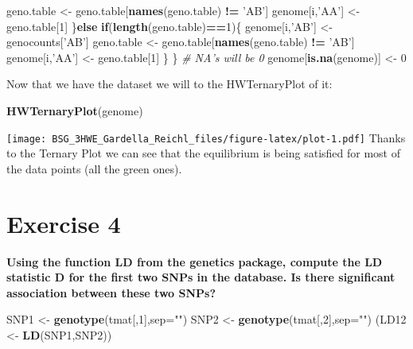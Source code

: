 \documentclass[]{article}
\newenvironment{Shaded}{\begin{snugshade}}{\end{snugshade}}
\newcommand{\KeywordTok}[1]{\textcolor[rgb]{0.13,0.29,0.53}{\textbf{#1}}}
\newcommand{\DataTypeTok}[1]{\textcolor[rgb]{0.13,0.29,0.53}{#1}}
\newcommand{\DecValTok}[1]{\textcolor[rgb]{0.00,0.00,0.81}{#1}}
\newcommand{\StringTok}[1]{\textcolor[rgb]{0.31,0.60,0.02}{#1}}
\newcommand{\CommentTok}[1]{\textcolor[rgb]{0.56,0.35,0.01}{\textit{#1}}}
\newcommand{\ControlFlowTok}[1]{\textcolor[rgb]{0.13,0.29,0.53}{\textbf{#1}}}
\newcommand{\OperatorTok}[1]{\textcolor[rgb]{0.81,0.36,0.00}{\textbf{#1}}}
\newcommand{\NormalTok}[1]{#1}
\begin{document}
\begin{Shaded}
\begin{Highlighting}[]
\NormalTok{    geno.table <-}\StringTok{ }\NormalTok{geno.table[}\KeywordTok{names}\NormalTok{(geno.table) }\OperatorTok{!=}\StringTok{ 'AB'}\NormalTok{]}
\NormalTok{    genome[i,}\StringTok{'AA'}\NormalTok{] <-}\StringTok{ }\NormalTok{geno.table[}\DecValTok{1}\NormalTok{]}
\NormalTok{  \}}\ControlFlowTok{else} \ControlFlowTok{if}\NormalTok{(}\KeywordTok{length}\NormalTok{(geno.table)}\OperatorTok{==}\DecValTok{1}\NormalTok{)\{}
\NormalTok{    genome[i,}\StringTok{'AB'}\NormalTok{] <-}\StringTok{ }\NormalTok{genocounts[}\StringTok{'AB'}\NormalTok{]  }
\NormalTok{    geno.table <-}\StringTok{ }\NormalTok{geno.table[}\KeywordTok{names}\NormalTok{(geno.table) }\OperatorTok{!=}\StringTok{ 'AB'}\NormalTok{]}
\NormalTok{    genome[i,}\StringTok{'AA'}\NormalTok{] <-}\StringTok{ }\NormalTok{geno.table[}\DecValTok{1}\NormalTok{]}
\NormalTok{  \}}
\NormalTok{\}}
\CommentTok{# NA's will be 0}
\NormalTok{genome[}\KeywordTok{is.na}\NormalTok{(genome)] <-}\StringTok{ }\DecValTok{0}
\end{Highlighting}
\end{Shaded}

Now that we have the dataset we will to the HWTernaryPlot of it:

\begin{Shaded}
\begin{Highlighting}[]
\KeywordTok{HWTernaryPlot}\NormalTok{(genome)}
\end{Highlighting}
\end{Shaded}

\texttt{[image: BSG\_3HWE\_Gardella\_Reichl\_files/figure-latex/plot-1.pdf]}
Thanks to the Ternary Plot we can see that the equilibrium is being
satisfied for most of the data points (all the green ones).

\section{Exercise 4}\label{exercise-4}

\textbf{Using the function LD from the genetics package, compute the LD
statistic D for the first two SNPs in the database. Is there significant
association between these two SNPs?}

\begin{Shaded}
\begin{Highlighting}[]
\NormalTok{SNP1 <-}\StringTok{ }\KeywordTok{genotype}\NormalTok{(tmat[,}\DecValTok{1}\NormalTok{],}\DataTypeTok{sep=}\StringTok{""}\NormalTok{)}
\NormalTok{SNP2 <-}\StringTok{ }\KeywordTok{genotype}\NormalTok{(tmat[,}\DecValTok{2}\NormalTok{],}\DataTypeTok{sep=}\StringTok{""}\NormalTok{)}
\NormalTok{(LD12 <-}\StringTok{ }\KeywordTok{LD}\NormalTok{(SNP1,SNP2))}
\end{Highlighting}
\end{Shaded}
\end{document}

